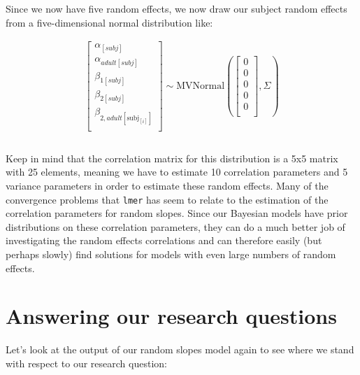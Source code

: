 \documentclass[
]{book}
\begin{document}
Since we now have five random effects, we now draw our subject random effects from a five-dimensional normal distribution like:

\begin{equation}
\begin{split}
\begin{bmatrix} \alpha_{[subj]} \\ \alpha_{adult[subj]} \\ \beta_{1[subj]} \\ \beta_{2[subj]} \\ \beta_{2,adult[\mathrm{subj}_{[i]}]} \\ \end{bmatrix}  
\sim \mathrm{MVNormal} ( \begin{bmatrix} 0 \\ 0 \\ 0 \\ 0 \\ 0 \\ \end{bmatrix}, \Sigma) \\ \\
\end{split}
\label{eq:616}
\end{equation}

Keep in mind that the correlation matrix for this distribution is a 5x5 matrix with 25 elements, meaning we have to estimate 10 correlation parameters and 5 variance parameters in order to estimate these random effects. Many of the convergence problems that \texttt{lmer} has seem to relate to the estimation of the correlation parameters for random slopes. Since our Bayesian models have prior distributions on these correlation parameters, they can do a much better job of investigating the random effects correlations and can therefore easily (but perhaps slowly) find solutions for models with even large numbers of random effects.

\hypertarget{answering-our-research-questions-1}{%
\section{Answering our research questions}\label{answering-our-research-questions-1}}

Let's look at the output of our random slopes model again to see where we stand with respect to our research question:
\end{document}
